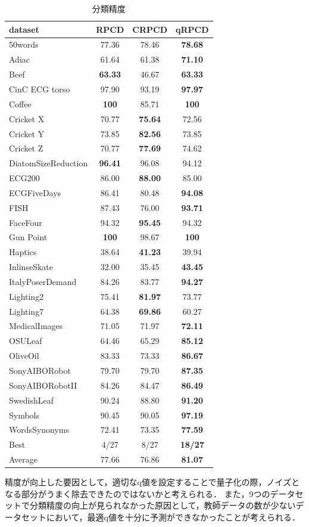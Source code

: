\documentclass{interim} %
\begin{document}
\begin{table}[t]
	\small
	\caption{分類精度}
	\label{ta:hikaku}
	\begin{tabular}{lccc}
		\hline
		dataset&RPCD&CRPCD&qRPCD\\
		\hline
		\hline
		50words&77.36&78.46&\bf{78.68}\\
		Adiac&61.64&61.38&\bf{71.10}\\
		Beef&\bf{63.33}&46.67&\bf{63.33}\\
		CinC ECG torso&97.90&93.19&\bf{97.97}\\
		Coffee&\bf{100}&85.71&\bf{100}\\
		Cricket X&70.77&\bf{75.64}&72.56\\
		Cricket Y&73.85&\bf{82.56}&73.85\\
		Cricket Z&70.77&\bf{77.69}&74.62\\
		DiatomSizeReduction&\bf{96.41}&96.08&94.12\\
		ECG200&86.00&\bf{88.00}&85.00\\
		ECGFiveDays&86.41&80.48&\bf{94.08}\\
		FISH&87.43&76.00&\bf{93.71}\\
		FaceFour&94.32&\bf{95.45}&94.32\\
		Gun Point&\bf{100}&98.67&\bf{100}\\
		Haptics&38.64&\bf{41.23}&39.94\\
		InlinseSkate&32.00&35.45&\bf{43.45}\\
		ItalyPoserDemand&84.26&83.77&\bf{94.27}\\
		Lighting2&75.41&\bf{81.97}&73.77\\
		Lighting7&64.38&\bfseries{69.86}&60.27\\
		MedicalImages&71.05&71.97&\bfseries{72.11}\\
		OSULeaf&64.46&65.29&\bfseries{85.12}\\
		OliveOil&83.33&73.33&\bfseries{86.67}\\
		SonyAIBORobot&79.70&79.70&\bfseries{87.35}\\
		SonyAIBORobotII&84.26&84.47&\bfseries{86.49}\\
		SwedishLeaf&90.24&88.80&\bfseries{91.20}\\
		Symbols&90.45&90.05&\bfseries{97.19}\\
		WordsSynonyms&72.41&73.35&\bfseries{77.59}\\
		\hline
		Best&4/27&8/27&\bf{18}/27\\
		Average&77.66&76.86&\bfseries{81.07}\\
		\hline
	\end{tabular}
\end{table}
精度が向上した要因として，適切なq値を設定することで量子化の際，ノイズとなる部分がうまく除去できたのではないかと考えられる．
また，9つのデータセットで分類精度の向上が見られなかった原因として，教師データの数が少ないデータセットにおいて，最適q値を十分に予測ができなかったことが考えられる．
\end{document}
